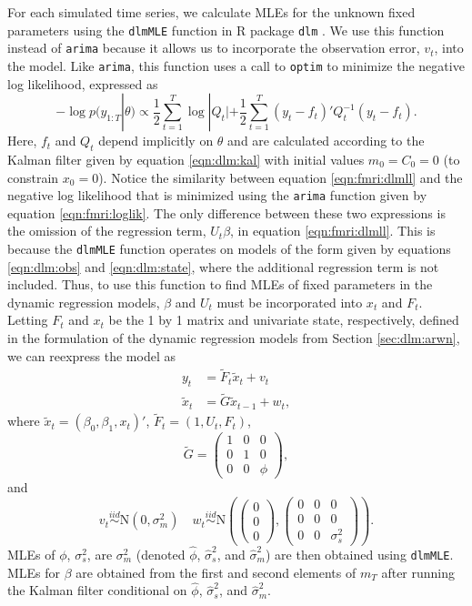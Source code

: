 For each simulated time series, we calculate MLEs for the unknown fixed parameters using the {\tt dlmMLE} function in R package {\tt dlm} \citep{petris:camp:2009:dynamic}. We use this function instead of {\tt arima} because it allows us to incorporate the observation error, $v_t$, into the model. Like {\tt arima}, this function uses a call to {\tt optim} to minimize the negative log likelihood, expressed as
\begin{equation}
-\log p(y_{1:T}|\theta) \propto \frac{1}{2}\sum_{t=1}^T \log |Q_t| + \frac{1}{2}\sum_{t=1}^T (y_t-f_t)'Q_t^{-1}(y_t-f_t). \label{eqn:fmri:dlmll}
\end{equation}
Here, $f_t$ and $Q_t$ depend implicitly on $\theta$ and are calculated according to the Kalman filter given by equation \eqref{eqn:dlm:kal} with initial values $m_0 = C_0 = 0$ (to constrain $x_0 = 0$). Notice the similarity between equation \eqref{eqn:fmri:dlmll} and the negative log likelihood that is minimized using the {\tt arima} function given by equation \eqref{eqn:fmri:loglik}. The only difference between these two expressions is the omission of the regression term, $U_t\beta$, in equation \eqref{eqn:fmri:dlmll}. This is because the {\tt dlmMLE} function operates on models of the form given by equations \eqref{eqn:dlm:obs} and \eqref{eqn:dlm:state}, where the additional regression term is not included. Thus, to use this function to find MLEs of fixed parameters in the dynamic regression models, $\beta$ and $U_t$ must be incorporated into $x_t$ and $F_t$. Letting $F_t$ and $x_t$ be the 1 by 1 matrix and univariate state, respectively, defined in the formulation of the dynamic regression models from Section \ref{sec:dlm:arwn}, we can reexpress the model as
\begin{align}
y_t &= \tilde{F}_t\tilde{x}_t + v_t \label{eqn:dlmmle:obs} \\
\tilde{x}_t &= \tilde{G}\tilde{x}_{t-1} + w_t, \label{eqn:dlmmle:state}
\end{align}
where $\tilde{x}_t = (\beta_0,\beta_1,x_t)'$, $\tilde{F}_t = (1,U_t,F_t)$,
\[\tilde{G} = \left(\begin{array}{ccc} 1 & 0 & 0 \\ 0 & 1 & 0 \\ 0 & 0 & \phi\end{array}\right), \]
and \[v_t \stackrel{iid}{\sim} \mbox{N}(0,\sigma^2_m) \quad w_t \stackrel{iid}{\sim} \mbox{N}\left(\left(\begin{array}{c} 0 \\ 0 \\ 0 \end{array}\right), \left(\begin{array}{ccc} 0 & 0 & 0 \\ 0 & 0 & 0 \\ 0 & 0 & \sigma^2_s \end{array}\right)\right).\]
MLEs of $\phi$, $\sigma^2_s$, are $\sigma^2_m$ (denoted $\hat{\phi}$, $\hat{\sigma}^2_s$, and $\hat{\sigma}^2_m$) are then obtained using {\tt dlmMLE}. MLEs for $\beta$ are obtained from the first and second elements of $m_T$ after running the Kalman filter conditional on $\hat{\phi}$, $\hat{\sigma}^2_s$, and $\hat{\sigma}^2_m$.

